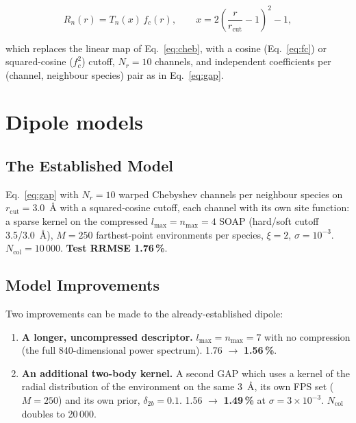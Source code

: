 \documentclass[11pt,a4paper]{article}
\begin{document}
\begin{equation}
R_n(r) = T_n(x)\,f_c(r), \qquad x = 2\left(\frac{r}{r_{\mathrm{cut}}}-1\right)^2-1,
\label{eq:cheb-warped}
\end{equation}

which replaces the linear map of Eq.~\ref{eq:cheb}, with a cosine (Eq.~\ref{eq:fc}) or squared-cosine ($f_c^2$) cutoff, $N_r = 10$ channels, and independent coefficients per (channel, neighbour species) pair as in Eq.~\ref{eq:gap}.

\section{Dipole models}\label{sec:dipole}

\subsection{The Established Model}\label{sec:dip-original}

Eq.~\ref{eq:gap} with $N_r=10$ warped Chebyshev channels per neighbour species on $r_{\mathrm{cut}}=3.0$~\AA{} with a
squared-cosine cutoff, each channel with its own site function: a sparse kernel on the compressed
$l_{\max}=n_{\max}=4$ SOAP (hard/soft cutoff 3.5/3.0~\AA{}), $M=250$ farthest-point
environments per species, $\xi=2$, $\sigma=10^{-3}$. $N_{\mathrm{col}} = 10\,000$. \textbf{Test RRMSE 1.76\,\%}.

\subsection{Model Improvements}\label{sec:dip-local}

Two improvements can be made to the already-established dipole:

\begin{enumerate}[leftmargin=*,nosep]
\item \textbf{A longer, uncompressed descriptor.} $l_{\max}=n_{\max}=7$ with no compression (the full
  840-dimensional power spectrum). 1.76 $\rightarrow$
  \textbf{1.56\,\%}.
\item \textbf{An additional two-body kernel.} A second GAP which uses a kernel of the radial distribution of the
  environment on the same 3~\AA{}, its own FPS set ($M=250$) and its own prior,
  $\delta_{2b}=0.1$. 1.56 $\rightarrow$ \textbf{1.49\,\%} at
  $\sigma=3\times10^{-3}$. $N_{\mathrm{col}}$ doubles to 20\,000.
\end{enumerate}
\end{document}
